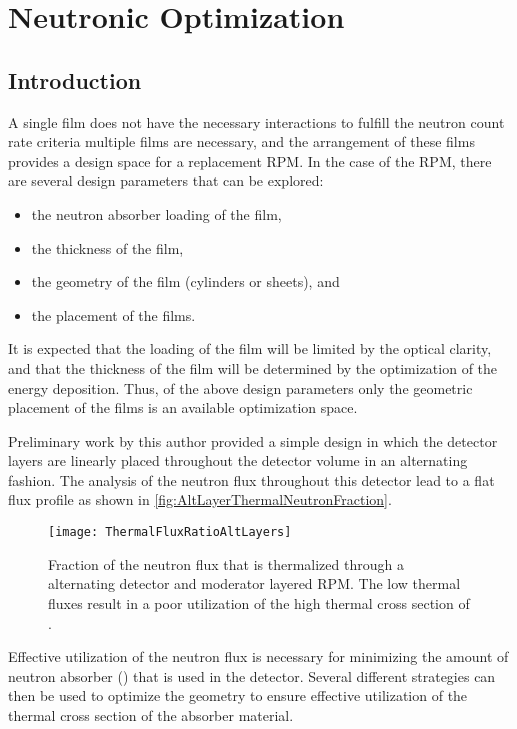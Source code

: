 \chapter{Neutronic Optimization}
\label{ch:GAOpt}
\section{Introduction}
A single film does not have the necessary interactions to fulfill the neutron count rate criteria multiple films are necessary, and the arrangement of these films provides a design space for a replacement RPM.
In the case of the RPM, there are several design parameters that can be explored:
\begin{itemize}
  \item the neutron absorber loading of the film,
  \item the thickness of the film,
  \item the geometry of the film (cylinders or sheets), and
  \item the placement of the films.
\end{itemize}
It is expected that the loading of the film will be limited by the optical clarity, and that the thickness of the film will be determined by the optimization of the energy deposition.
Thus, of the above design parameters only the geometric placement of the films is an available optimization space.

Preliminary work by this author provided a simple design in which the detector layers are linearly placed throughout the detector volume in an alternating fashion.
The analysis of the neutron flux throughout this detector lead to a flat flux profile as shown in \autoref{fig:AltLayerThermalNeutronFraction}.
\begin{figure}
  \texttt{[image: ThermalFluxRatioAltLayers]}
	\caption{Fraction of the neutron flux that is thermalized through a alternating detector and moderator layered RPM.  The low thermal fluxes result in a poor utilization of the high thermal cross section of .}
	\label{fig:AltLayerThermalNeutronFraction}
\end{figure}
Effective utilization of the neutron flux is necessary for minimizing the amount of neutron absorber () that is used in the detector.
Several different strategies can then be used to optimize the geometry to ensure effective utilization of the thermal cross section of the absorber material.

